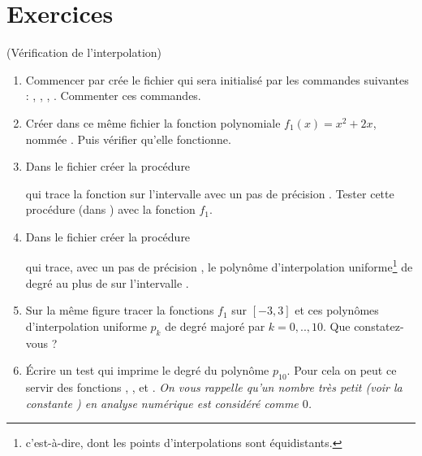 \documentclass[a4paper,12pt,reqno]{amsart}
\begin{document}
\section{Exercices}

\begin{exo} (Vérification de l'interpolation)

  \begin{enumerate}
    \item Commencer par crée le fichier  qui sera initialisé par les commandes suivantes : , , , . Commenter ces commandes.

    \item Créer dans ce même fichier la fonction polynomiale $f_{1}(x)=x^{2}+2x$, nommée . Puis vérifier qu'elle fonctionne.

    \item Dans le fichier  créer la procédure
    \begin{center}
    \end{center}
    qui trace la fonction  sur l'intervalle \mtlb{[-a,a]} avec un pas de précision . Tester cette procédure (dans ) avec la fonction $f_{1}$.

    \item Dans le fichier  créer la procédure
    \begin{center}
    \end{center}
    qui trace, avec un pas de précision , le polynôme d'interpolation uniforme\footnote{c'est-à-dire, dont les points d'interpolations sont équidistants.} de degré au plus  de  sur l'intervalle \mtlb{[-a,a]}.

    \item Sur la même figure tracer la fonctions $f_{1}$ sur $[-3,3]$ et ces polynômes d'interpolation uniforme $p_{k}$ de degré majoré par $k=0,..,10$. Que constatez-vous ?

    \item Écrire un test qui imprime le degré du polynôme $p_{10}$. Pour cela on peut ce servir des fonctions , , et .\newline
    \textit{On vous rappelle qu'un nombre très petit (voir la constante ) en analyse numérique est considéré comme $0$.}


  \end{enumerate}
\end{exo}
\end{document}
